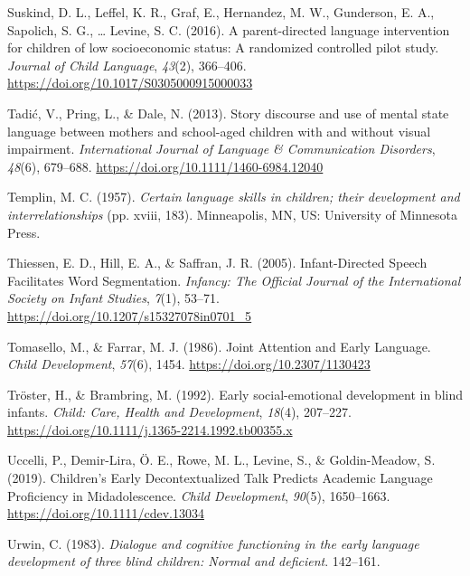 \documentclass[
  man,floatsintext]{apa6}
\newlength{\cslhangindent}
\newlength{\cslentryspacingunit} %
\newenvironment{CSLReferences}[2] %
 {%
  \setlength{\parindent}{0pt}
  \ifodd #1
  \let\oldpar\par
  \def\par{\hangindent=\cslhangindent\oldpar}
  \fi
  \setlength{\parskip}{#2\cslentryspacingunit}
 }%
 {}
\begin{document}
\begin{CSLReferences}{1}{0}
\leavevmode{}%
Suskind, D. L., Leffel, K. R., Graf, E., Hernandez, M. W., Gunderson, E. A., Sapolich, S. G., \ldots{} Levine, S. C. (2016). A parent-directed language intervention for children of low socioeconomic status: A randomized controlled pilot study. \emph{Journal of Child Language}, \emph{43}(2), 366--406. \url{https://doi.org/10.1017/S0305000915000033}

\leavevmode{}%
Tadić, V., Pring, L., \& Dale, N. (2013). Story discourse and use of mental state language between mothers and school-aged children with and without visual impairment. \emph{International Journal of Language \& Communication Disorders}, \emph{48}(6), 679--688. \url{https://doi.org/10.1111/1460-6984.12040}

\leavevmode{}%
Templin, M. C. (1957). \emph{Certain language skills in children; their development and interrelationships} (pp. xviii, 183). Minneapolis, MN, US: University of Minnesota Press.

\leavevmode{}%
Thiessen, E. D., Hill, E. A., \& Saffran, J. R. (2005). Infant-{Directed Speech Facilitates Word Segmentation}. \emph{Infancy: The Official Journal of the International Society on Infant Studies}, \emph{7}(1), 53--71. \url{https://doi.org/10.1207/s15327078in0701_5}

\leavevmode{}%
Tomasello, M., \& Farrar, M. J. (1986). Joint {Attention} and {Early Language}. \emph{Child Development}, \emph{57}(6), 1454. \url{https://doi.org/10.2307/1130423}

\leavevmode{}%
Tröster, H., \& Brambring, M. (1992). Early social-emotional development in blind infants. \emph{Child: Care, Health and Development}, \emph{18}(4), 207--227. \url{https://doi.org/10.1111/j.1365-2214.1992.tb00355.x}

\leavevmode{}%
Uccelli, P., Demir-Lira, Ö. E., Rowe, M. L., Levine, S., \& Goldin-Meadow, S. (2019). Children's {Early Decontextualized Talk Predicts Academic Language Proficiency} in {Midadolescence}. \emph{Child Development}, \emph{90}(5), 1650--1663. \url{https://doi.org/10.1111/cdev.13034}

\leavevmode{}%
Urwin, C. (1983). \emph{Dialogue and cognitive functioning in the early language development of three blind children: {Normal} and deficient}. 142--161.


\end{CSLReferences}
\end{document}
